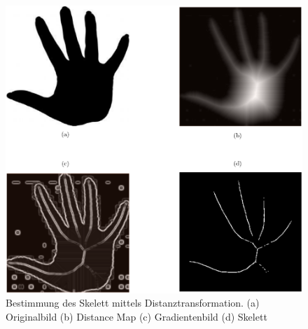 \begin{figure}[htbp]
\centering
\includegraphics[width=1.0\linewidth]{./fig/hand}
\caption{Bestimmung des Skelett mittels Distanztransformation. (a) Originalbild (b) Distance Map (c) Gradientenbild (d) Skelett}
\label{fig:hand-skelett}
\end{figure}
\newpage
